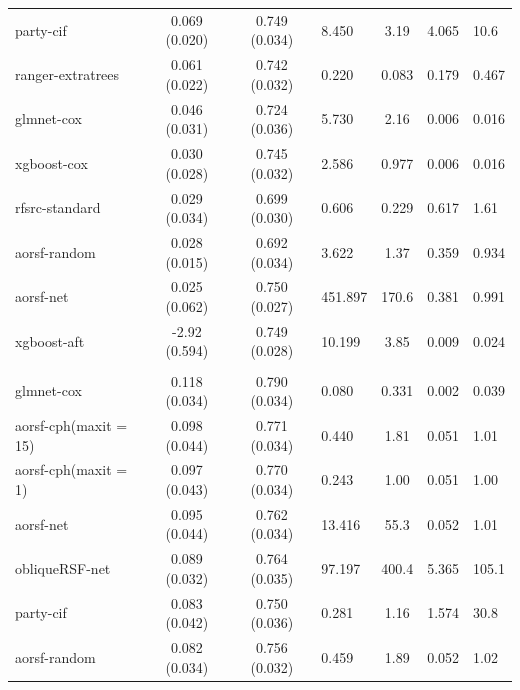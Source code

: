 \documentclass[twoside,11pt]{article}\usepackage[]{graphicx}\usepackage[]{color}
\newenvironment{knitrout}{}{} %
\begin{document}
\begin{knitrout}
\begin{longtable}{lcclccl}
\hspace{1em}party-cif & 0.069 (0.020) & 0.749 (0.034) & 8.450 & 3.19 & 4.065 & 10.6\\
\hspace{1em}ranger-extratrees & 0.061 (0.022) & 0.742 (0.032) & 0.220 & 0.083 & 0.179 & 0.467\\
\hspace{1em}glmnet-cox & 0.046 (0.031) & 0.724 (0.036) & 5.730 & 2.16 & 0.006 & 0.016\\
\hspace{1em}xgboost-cox & 0.030 (0.028) & 0.745 (0.032) & 2.586 & 0.977 & 0.006 & 0.016\\
\hspace{1em}rfsrc-standard & 0.029 (0.034) & 0.699 (0.030) & 0.606 & 0.229 & 0.617 & 1.61\\
\hspace{1em}aorsf-random & 0.028 (0.015) & 0.692 (0.034) & 3.622 & 1.37 & 0.359 & 0.934\\
\hspace{1em}aorsf-net & 0.025 (0.062) & 0.750 (0.027) & 451.897 & 170.6 & 0.381 & 0.991\\
\hspace{1em}xgboost-aft & -2.92 (0.594) & 0.749 (0.028) & 10.199 & 3.85 & 0.009 & 0.024\\
\addlinespace[0.3em]
\hline
\multicolumn{7}{l}{\textit{\textbf{FCL; death, n = 541, p = 7}}}\\
\hline
\hspace{1em}glmnet-cox & 0.118 (0.034) & 0.790 (0.034) & 0.080 & 0.331 & 0.002 & 0.039\\
\hspace{1em}aorsf-cph(maxit = 15) & 0.098 (0.044) & 0.771 (0.034) & 0.440 & 1.81 & 0.051 & 1.01\\
\hspace{1em}aorsf-cph(maxit = 1) & 0.097 (0.043) & 0.770 (0.034) & 0.243 & 1.00 & 0.051 & 1.00\\
\hspace{1em}aorsf-net & 0.095 (0.044) & 0.762 (0.034) & 13.416 & 55.3 & 0.052 & 1.01\\
\hspace{1em}obliqueRSF-net & 0.089 (0.032) & 0.764 (0.035) & 97.197 & 400.4 & 5.365 & 105.1\\
\hspace{1em}party-cif & 0.083 (0.042) & 0.750 (0.036) & 0.281 & 1.16 & 1.574 & 30.8\\
\hspace{1em}aorsf-random & 0.082 (0.034) & 0.756 (0.032) & 0.459 & 1.89 & 0.052 & 1.02\\

\end{longtable}
\end{knitrout}
\end{document}

